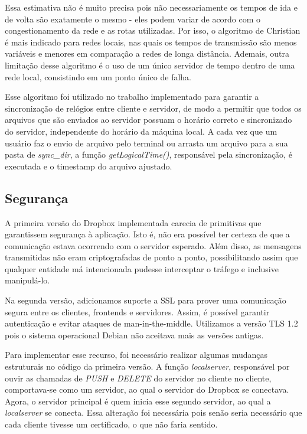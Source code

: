 \documentclass[a4paper]{article}
\begin{document}
Essa estimativa não é muito precisa pois não necessariamente os tempos de ida e de volta são exatamente o mesmo - eles podem variar de acordo com o congestionamento da rede e as rotas utilizadas. Por isso, o algoritmo de Christian é mais indicado para redes locais, nas quais os tempos de transmissão são menos variáveis e menores em comparação a redes de longa distância. Ademais, outra limitação desse algoritmo é o uso de um único servidor de tempo dentro de uma rede local, consistindo em um ponto único de falha.

Esse algoritmo foi utilizado no trabalho implementado para garantir a sincronização de relógios entre cliente e servidor, de modo a permitir que todos os arquivos que são enviados ao servidor possuam o horário correto e sincronizado do servidor, independente do horário da máquina local. A cada vez que um usuário faz o envio de arquivo pelo terminal ou arrasta um arquivo para a sua pasta de \textit{sync\_dir}, a função \textit{getLogicalTime()}, responsável pela sincronização, é executada e o timestamp do arquivo ajustado.

\subsection{Segurança}
    A primeira versão do Dropbox implementada carecia de primitivas que garantissem segurança à aplicação. Isto é, não era possível ter certeza de que a comunicação estava ocorrendo com o servidor esperado. Além disso, as mensagens transmitidas não eram criptografadas de ponto a ponto, possibilitando assim que qualquer entidade má intencionada pudesse interceptar o tráfego e inclusive manipulá-lo. 
    
Na segunda versão, adicionamos suporte a SSL para prover uma comunicação segura entre os clientes, frontends e servidores. Assim, é possível garantir autenticação e evitar ataques de man-in-the-middle. Utilizamos a versão TLS 1.2 pois o sistema operacional Debian não aceitava mais as versões antigas.

Para implementar esse recurso, foi necessário realizar algumas mudanças estruturais no código da primeira versão. A função \textit{localserver}, responsável por ouvir as chamadas de \textit{PUSH} e \textit{DELETE} do servidor no cliente no cliente, comportava-se como um servidor, ao qual o servidor do Dropbox se conectava. Agora, o servidor principal é quem inicia esse segundo servidor, ao qual a \textit{localserver} se conecta. Essa alteração foi necessária pois senão seria necessário que cada cliente tivesse um certificado, o que não faria sentido. 
\end{document}
